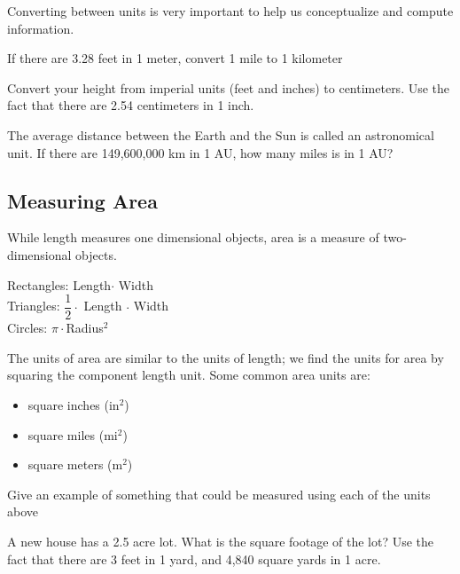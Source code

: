 \documentclass[notes]{subfiles}
\begin{document}
		Converting between units is very important to help us conceptualize and compute information.%
		
		\begin{ex}
			If there are 3.28 feet in 1 meter, convert 1 mile to 1 kilometer%
		\end{ex}
			\newpage
			
		\begin{ex}
			Convert your height from imperial units (feet and inches) to centimeters.  Use the fact that there are 2.54 centimeters in 1 inch.%
		\end{ex}
			
		\begin{ex}
			The average distance between the Earth and the Sun is called an astronomical unit.  If there are 149,600,000 km in 1 AU, how many miles is in 1 AU?
		\end{ex}
			
	\subsection*{Measuring Area}
		While length measures one dimensional objects, area is a measure of two-dimensional objects.%
		
		\begin{rmk}
			\tabitem Rectangles: Length\(\cdot\) Width\\[15pt]
			\tabitem Triangles: \(\dfrac{1}{2}\cdot\) Length \(\cdot\) Width\\[15pt]
			\tabitem Circles: \(\pi\cdot\)Radius\(^2\)
		\end{rmk}
		
		The units of area are similar to the units of length; we find the units for area by squaring the component length unit.  Some common area units are:%
		\begin{itemize}
		\item square inches (in\(^2\))%
		\item square miles (mi\(^2\))%
		\item square meters (m\(^2\))%
		\end{itemize}
			\newpage
			
		\begin{ex}
			Give an example of something that could be measured using each of the units above%
		\end{ex}
			
		\begin{ex}
			A new house has a 2.5 acre lot.  What is the square footage of the lot?  Use the fact that there are 3 feet in 1 yard, and 4,840 square yards in 1 acre.%
		\end{ex}
			
\end{document}
